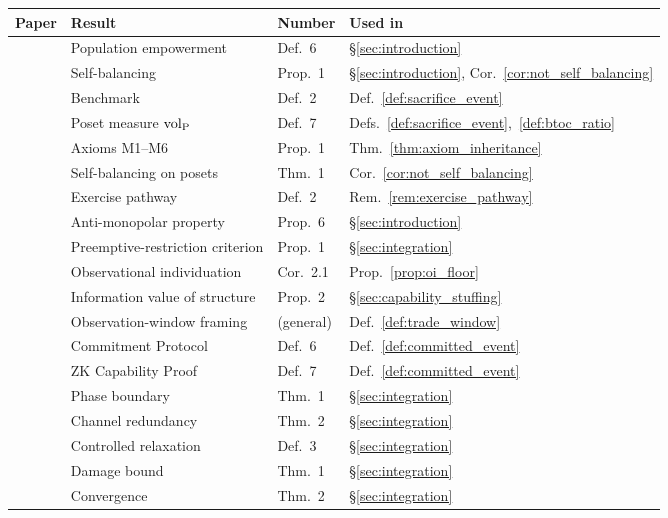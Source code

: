 \begin{center}
\small
\begin{tabular}{@{}llll@{}}
\toprule
\textbf{Paper} & \textbf{Result} & \textbf{Number}
  & \textbf{Used in} \\
\midrule
\citep{lasser2026gfm}
  & Population empowerment & Def.~6
  & \S\ref{sec:introduction} \\
\citep{lasser2026gfm}
  & Self-balancing & Prop.~1
  & \S\ref{sec:introduction}, Cor.~\ref{cor:not_self_balancing} \\
\citep{lasser2026poset}
  & Benchmark & Def.~2
  & Def.~\ref{def:sacrifice_event} \\
\citep{lasser2026poset}
  & Poset measure ${\operatorname{vol}_{\mathrm{P}}}$ & Def.~7
  & Defs.~\ref{def:sacrifice_event},~\ref{def:btoc_ratio} \\
\citep{lasser2026poset}
  & Axioms M1--M6 & Prop.~1
  & Thm.~\ref{thm:axiom_inheritance} \\
\citep{lasser2026poset}
  & Self-balancing on posets & Thm.~1
  & Cor.~\ref{cor:not_self_balancing} \\
\citep{lasser2026horizon}
  & Exercise pathway & Def.~2
  & Rem.~\ref{rem:exercise_pathway} \\
\citep{lasser2026horizon}
  & Anti-monopolar property & Prop.~6
  & \S\ref{sec:introduction} \\
\citep{lasser2026horizon}
  & Preemptive-restriction criterion & Prop.~1
  & \S\ref{sec:integration} \\
\citep{lasser2026horizon}
  & Observational individuation & Cor.~2.1
  & Prop.~\ref{prop:oi_floor} \\
\citep{lasser2026horizon}
  & Information value of structure & Prop.~2
  & \S\ref{sec:capability_stuffing} \\
\citep{lasser2026scm}
  & Observation-window framing & (general)
  & Def.~\ref{def:trade_window} \\
\citep{lasser2026exo}
  & Commitment Protocol & Def.~6
  & Def.~\ref{def:committed_event} \\
\citep{lasser2026exo}
  & ZK Capability Proof & Def.~7
  & Def.~\ref{def:committed_event} \\
\citep{lasser2026phase}
  & Phase boundary & Thm.~1
  & \S\ref{sec:integration} \\
\citep{lasser2026phase}
  & Channel redundancy & Thm.~2
  & \S\ref{sec:integration} \\
\citep{lasser2026wamura}
  & Controlled relaxation & Def.~3
  & \S\ref{sec:integration} \\
\citep{lasser2026wamura}
  & Damage bound & Thm.~1
  & \S\ref{sec:integration} \\
\citep{lasser2026wamura}
  & Convergence & Thm.~2
  & \S\ref{sec:integration} \\
\bottomrule
\end{tabular}
\end{center}
